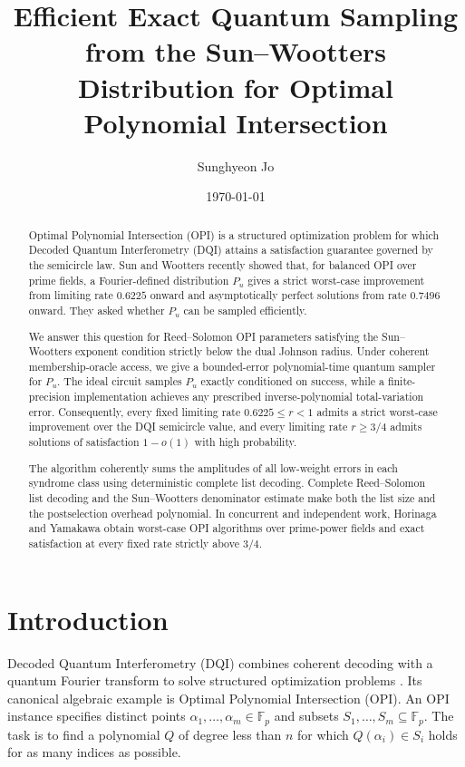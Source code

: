 \documentclass[11pt,letterpaper]{article}
\title{\textbf{Efficient Exact Quantum Sampling from the Sun--Wootters Distribution for Optimal Polynomial Intersection}}
\author{Sunghyeon Jo}
\date{\today}
\theoremstyle{definition}
\newcommand{\F}{\mathbb{F}}
\begin{document}
\hypersetup{pageanchor=false}
\maketitle

\begin{abstract}
Optimal Polynomial Intersection (OPI) is a structured optimization problem for which Decoded Quantum Interferometry (DQI) attains a satisfaction guarantee governed by the semicircle law. Sun and Wootters recently showed that, for balanced OPI over prime fields, a Fourier-defined distribution $P_u$ gives a strict worst-case improvement from limiting rate $0.6225$ onward and asymptotically perfect solutions from rate $0.7496$ onward. They asked whether $P_u$ can be sampled efficiently.

We answer this question for Reed--Solomon OPI parameters satisfying the Sun--Wootters exponent condition strictly below the dual Johnson radius. Under coherent membership-oracle access, we give a bounded-error polynomial-time quantum sampler for $P_u$. The ideal circuit samples $P_u$ exactly conditioned on success, while a finite-precision implementation achieves any prescribed inverse-polynomial total-variation error. Consequently, every fixed limiting rate $0.6225\le r<1$ admits a strict worst-case improvement over the DQI semicircle value, and every limiting rate $r\ge 3/4$ admits solutions of satisfaction $1-o(1)$ with high probability.

The algorithm coherently sums the amplitudes of all low-weight errors in each syndrome class using deterministic complete list decoding. Complete Reed--Solomon list decoding and the Sun--Wootters denominator estimate make both the list size and the postselection overhead polynomial. In concurrent and independent work, Horinaga and Yamakawa obtain worst-case OPI algorithms over prime-power fields and exact satisfaction at every fixed rate strictly above $3/4$.
\end{abstract}

\thispagestyle{empty}
\clearpage
\tableofcontents
\thispagestyle{empty}
\clearpage
\hypersetup{pageanchor=true}

\section{Introduction}

Decoded Quantum Interferometry (DQI) combines coherent decoding with a quantum Fourier transform to solve structured optimization problems \cite{JordanEtAl2025}.  Its canonical algebraic example is Optimal Polynomial Intersection (OPI).  An OPI instance specifies distinct points $\alpha_1,\ldots,\alpha_m\in\F_p$ and subsets $S_1,\ldots,S_m\subseteq\F_p$.  The task is to find a polynomial $Q$ of degree less than $n$ for which $Q(\alpha_i)\in S_i$ holds for as many indices as possible.
\end{document}
